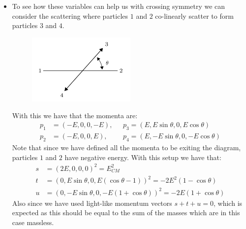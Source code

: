 \documentclass[11pt]{article}
\numberwithin{equation}{section}
\begin{document}
\begin{itemize}
\item To see how these variables can help us with crossing symmetry we can consider the scattering where particles $1$ and $2$ co-linearly scatter to form particles $3$ and $4$. 
\begin{figure}[H]
\centering
\includegraphics[width=0.5\textwidth]{1_2_scatter}
\end{figure}
With this we have that the momenta are:
\begin{align*}
    p_1 &= (-E,0,0,-E), ~~~&p_3 = (E,E\sin \theta,0,E\cos \theta) \\
    p_2 &= (-E,0,0,E), ~~~&p_4 = (E,-E\sin \theta,0,-E\cos \theta)   
\end{align*}
Note that since we have defined all the momenta to be exiting the diagram, particles $1$ and $2$ have negative energy. With this setup we have that:
\begin{align*}
    s &= (2E,0,0,0)^2  = E_{CM}^2 \\
    t &= (0,E\sin \theta,0,E(\cos\theta-1))^2 = -2E^2(1-\cos \theta) \\
    u &= (0,-E\sin\theta,0,-E(1+\cos\theta))^2 = -2E(1+\cos\theta)
\end{align*}
Also since we have used light-like momentum vectors $s+t+u=0$, which is expected as this should be equal to the sum of the masses which are in this case massless. 


\end{itemize}
\end{document}
